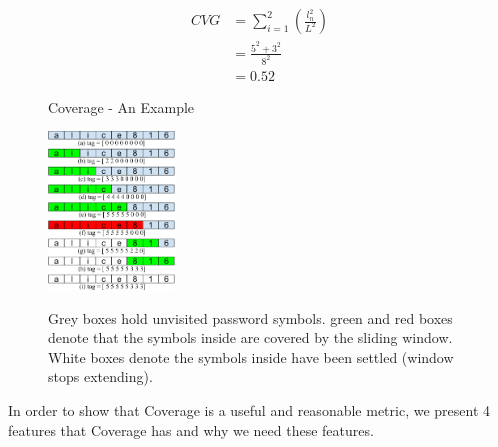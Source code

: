 \documentclass{sig-alternate}
\begin{document}
\begin{equation}
\begin{split}
CVG & = \sum_{i=1}^2 (\frac{l_n^2}{L^2}) \\
&= \frac{5^2 + 3^2}{8^2}\\
&= 0.52
\end{split}
\end{equation}

\begin{figure}[h!]
\centering
  \caption{Coverage - An Example}{}
  \label{f1}
  \centering
    \includegraphics[width=0.3\textwidth]{fig/cvgfig}
\caption*{Grey boxes hold unvisited password symbols. green and red boxes denote that the symbols inside are covered by the sliding window. White boxes denote the symbols inside have been settled (window stops extending). }

\end{figure}


In order to show that Coverage is a useful and reasonable metric, we present 4 features that Coverage has and why we need these features.
\end{document}
